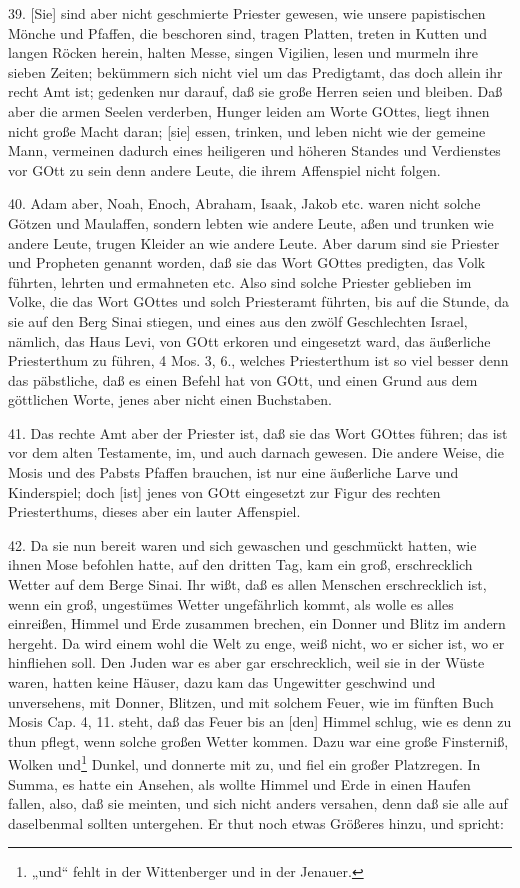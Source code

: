 39. [Sie] sind aber nicht geschmierte Priester gewesen, wie unsere papistischen Mönche und Pfaffen, die beschoren sind, tragen Platten, treten in Kutten und langen Röcken herein, halten Messe, singen Vigilien, lesen und murmeln ihre sieben Zeiten; bekümmern sich nicht viel um das Predigtamt, das doch allein ihr recht Amt ist; gedenken nur darauf, daß sie große Herren seien und bleiben. Daß aber die armen Seelen verderben, Hunger leiden am Worte GOttes, liegt ihnen nicht große Macht daran; [sie] essen, trinken, und leben nicht wie der gemeine Mann, vermeinen dadurch eines heiligeren und höheren Standes und Verdienstes vor GOtt zu sein denn andere Leute, die ihrem Affenspiel nicht folgen.

40. Adam aber, Noah, Enoch, Abraham, Isaak, Jakob etc. waren nicht solche Götzen und Maulaffen, sondern lebten wie andere Leute, aßen und trunken wie andere Leute, trugen Kleider an wie andere Leute. Aber darum sind sie Priester und Propheten genannt worden, daß sie das Wort GOttes predigten, das Volk führten, lehrten und ermahneten etc. Also sind solche Priester geblieben im Volke, die das Wort GOttes und solch Priesteramt führten, bis auf die Stunde, da sie auf den Berg Sinai stiegen, und eines aus den zwölf Geschlechten Israel, nämlich, das Haus Levi, von GOtt erkoren und eingesetzt ward, das äußerliche Priesterthum zu führen, 4 Mos. 3, 6., welches Priesterthum ist so viel besser denn das päbstliche, daß es einen Befehl hat von GOtt, und einen Grund aus dem göttlichen Worte, jenes aber nicht einen Buchstaben.

41. Das rechte Amt aber der Priester ist, daß sie das Wort GOttes führen; das ist vor dem alten Testamente, im, und auch darnach gewesen. Die andere Weise, die Mosis und des Pabsts Pfaffen brauchen, ist nur eine äußerliche Larve
und Kinderspiel; doch [ist] jenes von GOtt eingesetzt zur Figur des rechten Priesterthums, dieses aber ein lauter Affenspiel.

42. Da sie nun bereit waren und sich gewaschen und geschmückt hatten, wie ihnen Mose befohlen hatte, auf den dritten Tag, kam ein groß, erschrecklich Wetter auf dem Berge Sinai. Ihr wißt, daß es allen Menschen erschrecklich ist, wenn ein groß, ungestümes Wetter ungefährlich kommt, als wolle es alles einreißen, Himmel und Erde zusammen brechen, ein Donner und Blitz im andern hergeht. Da wird einem wohl die Welt zu enge, weiß nicht, wo er sicher ist, wo er hinfliehen soll. Den Juden war es aber gar erschrecklich, weil sie in der Wüste waren, hatten keine Häuser, dazu kam das Ungewitter geschwind und unversehens, mit Donner, Blitzen, und mit solchem Feuer, wie im fünften Buch Mosis Cap. 4, 11. steht, daß das Feuer bis an [den] Himmel schlug, wie es denn zu thun pflegt, wenn solche großen Wetter kommen. Dazu war eine große Finsterniß, Wolken und\footnote{„und“ fehlt in der Wittenberger und in der Jenauer.} Dunkel, und donnerte mit zu, und fiel ein großer Platzregen. In Summa, es hatte ein Ansehen, als wollte Himmel und Erde in einen Haufen fallen, also, daß sie meinten, und sich nicht anders versahen, denn daß sie alle auf daselbenmal sollten untergehen. Er thut noch etwas Größeres hinzu, und spricht:

